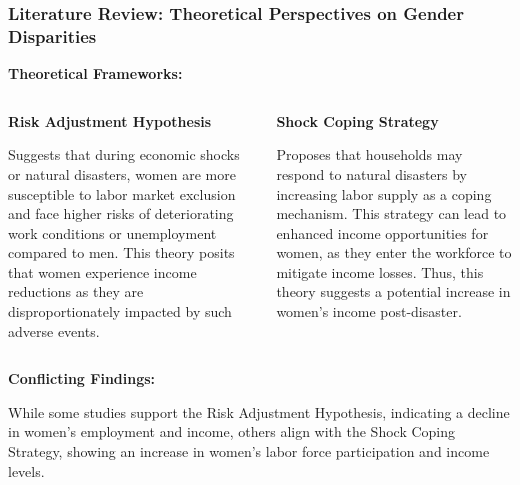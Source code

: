 \documentclass[serif, aspectratio=169]{beamer}
\newcommand{\returnbutton}[2]{%
  \vspace{-1.0cm}  %
  \hfill  %
  \hyperlink{#1}{%
    {\footnotesize\beamerbutton{#2}}%
  }%
  \vspace{0.3cm}  %
}
\begin{document}
\begin{frame}[label=theoretical_perspective]
\frametitle{Literature Review: Theoretical Perspectives on Gender Disparities}

\vspace{0.2cm}

\returnbutton{literature_review2}{Return}

    \textbf{Theoretical Frameworks:}
    
    \vspace{0.1cm}
    
    \begin{columns}[T] %
        \begin{column}{0.48\textwidth}
            \textbf{Risk Adjustment Hypothesis}
            
            \vspace{0.1cm}
            
            Suggests that during economic shocks or natural disasters, women are more susceptible to labor market exclusion and face higher risks of deteriorating work conditions or unemployment compared to men. This theory posits that women experience income reductions as they are disproportionately impacted by such adverse events.
        \end{column}
        \hfill
        \begin{column}{0.48\textwidth}
            \textbf{Shock Coping Strategy}
            
            \vspace{0.1cm}
            
            Proposes that households may respond to natural disasters by increasing labor supply as a coping mechanism. This strategy can lead to enhanced income opportunities for women, as they enter the workforce to mitigate income losses. Thus, this theory suggests a potential increase in women's income post-disaster.
        \end{column}
    \end{columns}
    
    \vspace{0.3cm}
    
    \textbf{Conflicting Findings:}
    
    While some studies support the Risk Adjustment Hypothesis, indicating a decline in women's employment and income, others align with the Shock Coping Strategy, showing an increase in women's labor force participation and income levels.

\end{frame}
\end{document}
